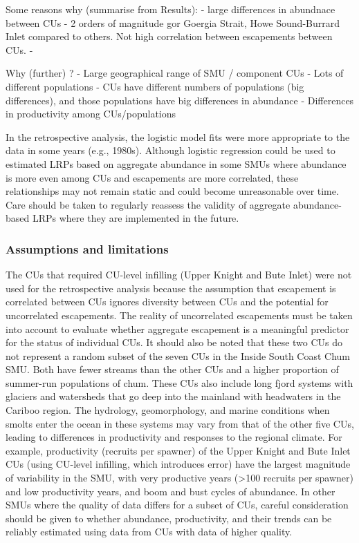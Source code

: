 \documentclass[11pt]{book}
\begin{document}
Some reasons why (summarise from Results): - large differences in abundnace between CUs - 2 orders of magnitude gor Goergia Strait, Howe Sound-Burrard Inlet compared to others. Not high correlation between escapements between CUs. -

Why (further) ? - Large geographical range of SMU / component CUs - Lots of different populations - CUs have different numbers of populations (big differences), and those populations have big differences in abundance - Differences in productivity among CUs/populations

In the retrospective analysis, the logistic model fits were more appropriate to the data in some years (e.g., 1980s). Although logistic regression could be used to estimated LRPs based on aggregate abundance in some SMUs where abundance is more even among CUs and escapements are more correlated, these relationships may not remain static and could become unreasonable over time. Care should be taken to regularly reassess the validity of aggregate abundance-based LRPs where they are implemented in the future.

\hypertarget{assumptions-and-limitations}{%
\subsubsection{Assumptions and limitations}\label{assumptions-and-limitations}}

The CUs that required CU-level infilling (Upper Knight and Bute Inlet) were not used for the retrospective analysis because the assumption that escapement is correlated between CUs ignores diversity between CUs and the potential for uncorrelated escapements. The reality of uncorrelated escapements must be taken into account to evaluate whether aggregate escapement is a meaningful predictor for the status of individual CUs. It should also be noted that these two CUs do not represent a random subset of the seven CUs in the Inside South Coast Chum SMU. Both have fewer streams than the other CUs and a higher proportion of summer-run populations of chum. These CUs also include long fjord systems with glaciers and watersheds that go deep into the mainland with headwaters in the Cariboo region. The hydrology, geomorphology, and marine conditions when smolts enter the ocean in these systems may vary from that of the other five CUs, leading to differences in productivity and responses to the regional climate. For example, productivity (recruits per spawner) of the Upper Knight and Bute Inlet CUs (using CU-level infilling, which introduces error) have the largest magnitude of variability in the SMU, with very productive years (\textgreater100 recruits per spawner) and low productivity years, and boom and bust cycles of abundance. In other SMUs where the quality of data differs for a subset of CUs, careful consideration should be given to whether abundance, productivity, and their trends can be reliably estimated using data from CUs with data of higher quality.
\end{document}

